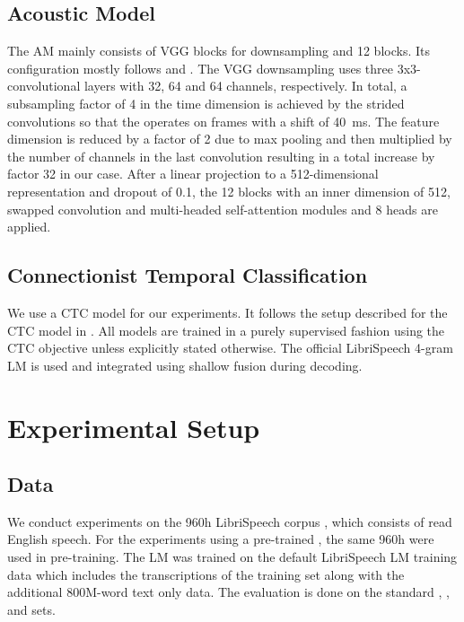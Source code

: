 \documentclass{INTERSPEECH2023}
\begin{document}
\subsection{Acoustic Model}
The \gls{AM} mainly consists of \gls{VGG} \addref blocks for downsampling and 12 \conformer blocks.
Its configuration mostly follows \cite{zeineldeen2022conformer} and \cite{zhou2022efficient}.
The \gls{VGG} downsampling uses three 3x3-convolutional layers with 32, 64 and 64 channels, respectively.
In total, a subsampling factor of 4 in the time dimension is achieved by the strided convolutions so that the \conformer operates on frames with a shift of \SI{40}{\milli\second}.
The feature dimension is reduced by a factor of 2 due to max pooling and then multiplied by the number of channels in the last convolution resulting in a total increase by factor 32 in our case.
After a linear projection to a 512-dimensional representation and dropout of 0.1, the 12 \conformer blocks with an inner dimension of 512, swapped convolution and multi-headed self-attention modules and 8 heads are applied.


\subsection{Connectionist Temporal Classification}
We use a \gls{CTC} model for our experiments.
It follows the setup described for the \gls{CTC} model in \cite{zhou2022efficient}.
All models are trained in a purely supervised fashion using the \gls{CTC} objective unless explicitly stated otherwise.
The official LibriSpeech 4-gram \gls{LM} is used and integrated using shallow fusion \cite{gulcehre2015shallow} during decoding.

\section{Experimental Setup}
\subsection{Data}
We conduct experiments on the 960h LibriSpeech corpus \cite{panayotov2015librispeech}, which consists of read English speech.
For the experiments using a pre-trained \wvtwo \fe, the same 960h were used in pre-training.
The \gls{LM} was trained on the default LibriSpeech \gls{LM} training data which includes the transcriptions of the training set along with the additional 800M-word text only data.
The evaluation is done on the standard \devclean, \devother, \testclean and \testother sets.
\end{document}
